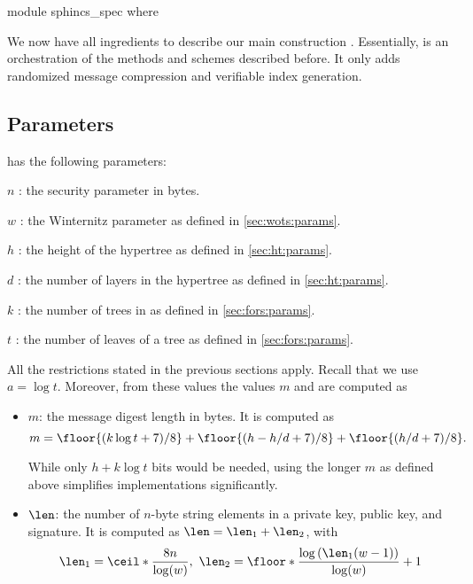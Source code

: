 \begin{code}
  module sphincs_spec where
\end{code}
\label{sec:spx}
We now have all ingredients to describe our main construction \spx. 
Essentially, \spx is an orchestration of the methods and schemes described 
before. It only adds randomized message compression and verifiable index
generation. 

\subsection{\spx Parameters}

\spx has the following parameters:
\begin{description}
 \item  $n$ : the security parameter in bytes.
 \item  $w$ : the Winternitz parameter as defined in \autoref{sec:wots:params}.
 \item  $h$ : the height of the hypertree as defined in \autoref{sec:ht:params}.
 \item  $d$ : the number of layers in the hypertree as defined in \autoref{sec:ht:params}.
 \item  $k$ : the number of trees in \fors as defined in \autoref{sec:fors:params}.
 \item  $t$ : the number of leaves of a \fors tree as defined in \autoref{sec:fors:params}.
\end{description}

All the restrictions stated in the previous sections apply. Recall that 
we use $a = \log t$. Moreover, from these values the values $m$ and \len are
computed as
\begin{itemize}
  \item $m$: the message digest length in bytes. 
  It is computed as 
  $$m=\floor{(k\log t +7)/ 8} + \floor{(h - h/d +7)/ 8} + \floor{(h / d +7)/ 8}.$$

  While only $h + k\log t$ bits would be needed, using the longer $m$ as defined 
  above simplifies implementations significantly.
  \item $\len$: the number of $n$-byte string elements in a \wotsp private
        key, public key, and signature. It is computed as $\len =
        \len_1 + \len_2$, with
        \begin{equation*}
          \len_1 = \ceil*{\frac{8n}{\log(w)}},\
          \len_2 = \floor*{\frac{\log{(\len_1(w - 1))}}{\log(w)}} + 1
        \end{equation*}
\end{itemize}

